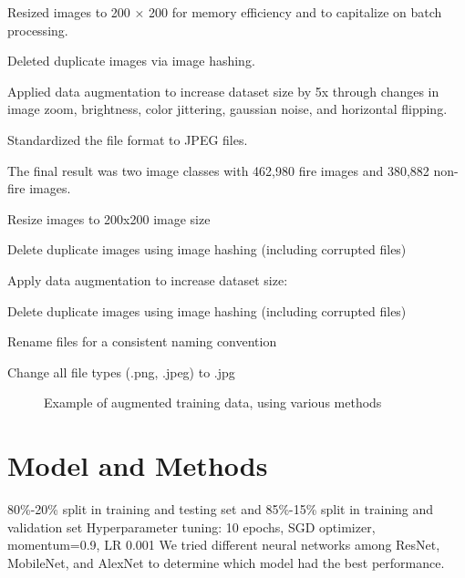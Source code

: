 Resized images to 200 × 200 for memory efficiency and to capitalize on batch processing.

Deleted duplicate images via image hashing.

Applied data augmentation to increase dataset size by 5x through changes in image zoom, brightness, color jittering, gaussian noise, and horizontal flipping.

Standardized the file format to JPEG files.

The final result was two image classes with 462,980 fire images and 380,882 non-fire images.

Resize images to 200x200 image size

Delete duplicate images using image hashing (including corrupted files)

Apply data augmentation to increase dataset size:

Delete duplicate images using image hashing (including corrupted files)

Rename files for a consistent naming convention

Change all file types (.png, .jpeg) to .jpg

\begin{figure}%
    \centering
    \qquad
	\qquad

	\qquad
	\qquad
    \caption{
		Example of augmented training data, using various methods
	}%
    \label{fig:example}%
\end{figure}

\section{Model and Methods}

80\%-20\% split in training and testing set and 85\%-15\% split in training and validation set
Hyperparameter tuning: 10 epochs, SGD optimizer, momentum=0.9, LR 0.001
We tried different neural networks among ResNet, MobileNet, and AlexNet to determine which model had the best performance.

